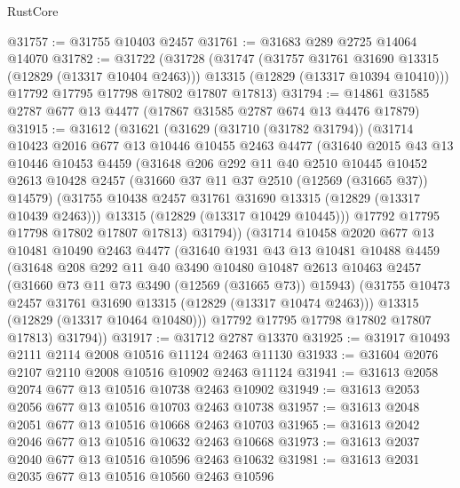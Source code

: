 \begin{lexlean}{RustCore}
\begin{coremodule}
@31757 := @31755 @10403 @2457
@31761 := @31683 @289 @2725 @14064 @14070
@31782 := @31722
    (@31728
      (@31747
        (@31757 @31761 @31690 @13315 (@12829 (@13317 @10404 @2463)))
        @13315
        (@12829 (@13317 @10394 @10410)))
      @17792
      @17795
      @17798
      @17802
      @17807
      @17813)
@31794 := @14861 @31585 @2787 @677 @13 @4477 (@17867 @31585 @2787 @674 @13 @4476 @17879)
@31915 := @31612
    (@31621
      (@31629
        (@31710 (@31782 @31794))
        (@31714
          @10423
          @2016
          @677
          @13
          @10446
          @10455
          @2463
          @4477
          (@31640
            @2015
            @43
            @13
            @10446
            @10453
            @4459
            (@31648
              @206
              @292
              @11
              @40
              @2510
              @10445
              @10452
              @2613
              @10428
              @2457
              (@31660 @37 @11 @37 @2510 (@12569 (@31665 @37)) @14579)
              (@31755 @10438 @2457 @31761 @31690 @13315 (@12829 (@13317 @10439 @2463)))
              @13315
              (@12829 (@13317 @10429 @10445)))
            @17792
            @17795
            @17798
            @17802
            @17807
            @17813)
          @31794))
      (@31714
        @10458
        @2020
        @677
        @13
        @10481
        @10490
        @2463
        @4477
        (@31640
          @1931
          @43
          @13
          @10481
          @10488
          @4459
          (@31648
            @208
            @292
            @11
            @40
            @3490
            @10480
            @10487
            @2613
            @10463
            @2457
            (@31660 @73 @11 @73 @3490 (@12569 (@31665 @73)) @15943)
            (@31755 @10473 @2457 @31761 @31690 @13315 (@12829 (@13317 @10474 @2463)))
            @13315
            (@12829 (@13317 @10464 @10480)))
          @17792
          @17795
          @17798
          @17802
          @17807
          @17813)
        @31794))
@31917 := @31712 @2787 @13370
@31925 := @31917 @10493 @2111 @2114 @2008 @10516 @11124 @2463 @11130
@31933 := @31604 @2076 @2107 @2110 @2008 @10516 @10902 @2463 @11124
@31941 := @31613 @2058 @2074 @677 @13 @10516 @10738 @2463 @10902
@31949 := @31613 @2053 @2056 @677 @13 @10516 @10703 @2463 @10738
@31957 := @31613 @2048 @2051 @677 @13 @10516 @10668 @2463 @10703
@31965 := @31613 @2042 @2046 @677 @13 @10516 @10632 @2463 @10668
@31973 := @31613 @2037 @2040 @677 @13 @10516 @10596 @2463 @10632
@31981 := @31613 @2031 @2035 @677 @13 @10516 @10560 @2463 @10596

\end{coremodule}
\end{lexlean}
